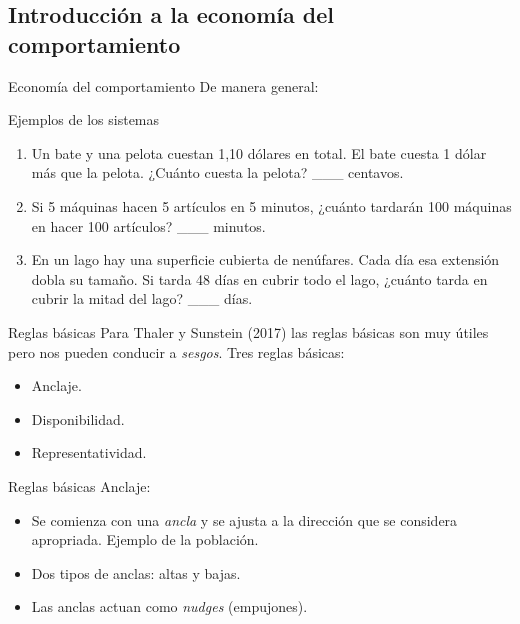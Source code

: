 \documentclass[11pt, aspectratio=169, compress]{beamer}
\begin{document}
\subsection{Introducción a la economía del comportamiento}
\begin{frame}{Economía del comportamiento}
De manera general: 

\end{frame}
\begin{frame}{Ejemplos de los sistemas}
\begin{enumerate}
	\item Un bate y una pelota cuestan 1,10 dólares en total. El bate cuesta 1 dólar
	más que la pelota. ¿Cuánto cuesta la pelota? \_\_\_ centavos.
	\item Si 5 máquinas hacen 5 artículos en 5 minutos, ¿cuánto tardarán 100
	máquinas en hacer 100 artículos? \_\_\_ minutos.
	\item En un lago hay una superficie cubierta de nenúfares. Cada día esa extensión
	dobla su tamaño. Si tarda 48 días en cubrir todo el lago, ¿cuánto tarda en
	cubrir la mitad del lago? \_\_\_ días.
\end{enumerate}
\end{frame}
\begin{frame}{Reglas básicas}
	Para Thaler y Sunstein (2017) las reglas básicas son muy útiles pero nos pueden conducir a \textit{sesgos}. Tres reglas básicas: 
	\begin{itemize}
		\item Anclaje. 
		\item Disponibilidad. 
		\item Representatividad.  
	\end{itemize}
\end{frame}
\begin{frame}{Reglas básicas}
	Anclaje: 
	\begin{itemize}
		\item Se comienza con una \textit{ancla} y se ajusta a la dirección que se considera apropriada. Ejemplo de la población. 
		\item Dos tipos de anclas: altas y bajas. 
		\item Las anclas actuan como \textit{nudges} (empujones).  
	\end{itemize}
\end{frame}
\end{document}

